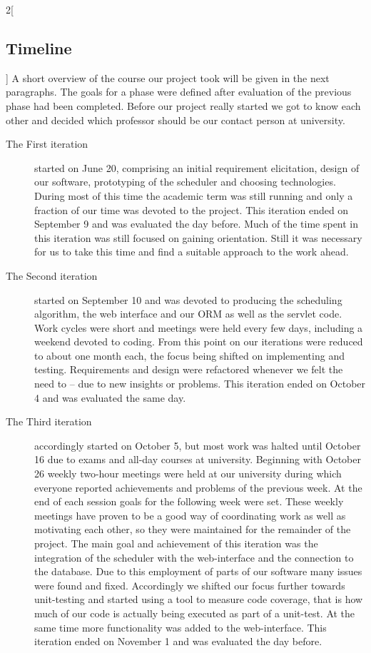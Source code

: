 \begin{multicols}{2}[\subsection{Timeline}]
\label{sec:Timeline}
A short overview of the course our project took will be given in the next paragraphs. The goals for a phase were defined after evaluation of the previous phase had been completed. Before our project really started we got to know each other and decided which professor should be our contact person at university.

\begin{description}
\item[The First iteration] started on June 20, comprising an initial requirement elicitation, design of our software, prototyping of the scheduler and choosing technologies. During most of this time the academic term was still running and only a fraction of our time was devoted to the project. This iteration ended on September 9 and was evaluated the day before. Much of the time spent in this iteration was still focused on gaining orientation. Still it was necessary for us to take this time and find a suitable approach to the work ahead.

\item[The Second iteration] started on September 10 and was devoted to producing the scheduling algorithm, the web interface and our ORM as well as the servlet code. Work cycles were short and meetings were held every few days, including a weekend  devoted to coding. From this point on our iterations were reduced to about one month each, the focus being shifted on implementing and testing. Requirements and design were refactored whenever we felt the need to -- due to new insights or problems. This iteration ended on October 4 and was evaluated the same day.

\item[The Third iteration] accordingly started on October 5, but most work was halted until October 16 due to exams and all-day courses at university. Beginning with October 26 weekly two-hour meetings were held at our university during which everyone reported achievements and problems of the previous week. At the end of each session goals for the following week were set. These weekly meetings have proven to be a good way of coordinating work as well as motivating each other, so they were maintained for the remainder of the project. The main goal and achievement of this iteration was the integration of the scheduler with the web-interface and the connection to the database. Due to this employment of parts of our software many issues were found and fixed. Accordingly we shifted our focus further towards unit-testing and started using a tool to measure code coverage, that is how much of our code is actually being executed  as part of a unit-test. At the same time more  functionality was added to the web-interface. This iteration ended on November 1 and was evaluated the day before.


\end{description}
\end{multicols}

